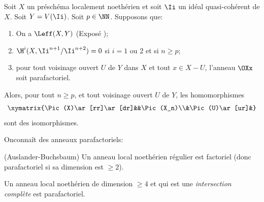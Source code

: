 \begin{proposition} \label{XI.3.12}
Soit $X$ un pr\'esch\'ema localement noeth\'erien et soit $\Ii$ un id\'eal quasi-coh\'erent de $X$. Soit $Y=V(\Ii)$. Soit $p\in\NN$. Supposons que:
\begin{enumerate}
\item[1)] On a $\Leff(X, Y)$ (\textup{Expos\'e} );
\item[2)] $\H^i(X, \Ii^{n+1}/\Ii^{n+2})=0$ si $i=1$ ou $2$ et si $n\geq p$;
\item[3)] pour tout voisinage ouvert $U$ de $Y$ dans $X$ et tout $x\in X-U$, l'anneau $\OXx$ soit parafactoriel.
\end{enumerate}
\noindent
Alors, pour tout $n\geq p$, et tout voisinage ouvert $U$ de $Y$, les homomorphismes
\[
\xymatrix{\Pic(X)\ar[rr]\ar[dr]&&\Pic(X_n)\\&\Pic(U)\ar[ur]&}
\]
sont des isomorphismes.
\end{proposition}

On\pageoriginale conna\^it des anneaux parafactoriels:

\skpt
\begin{theoreme} \label{XI.3.13}
\begin{enumeratei}
\item
(Auslander-Buchsbaum) Un anneau local noeth\'erien r\'egulier est factoriel (donc parafactoriel si sa dimension est $\geq 2$).
\item
Un anneau local noeth\'erien de dimension $\geq 4$ et qui est une \emph{intersection compl\`ete} est parafactoriel.
\end{enumeratei}
\end{theoreme}

